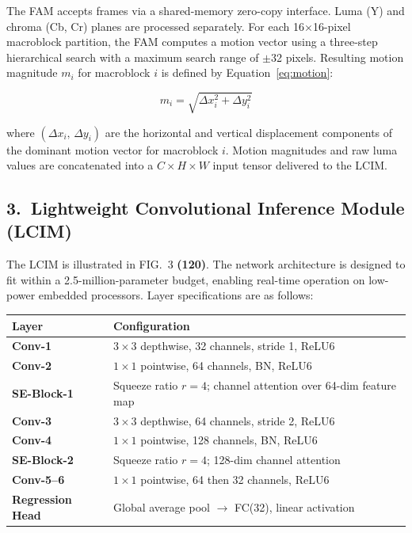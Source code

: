 \documentclass[12pt,letterpaper]{article}
\newcommand{\refnum}[1]{\textbf{(#1)}}
\begin{document}
The FAM accepts frames via a shared-memory zero-copy interface. Luma (Y) and chroma
(Cb, Cr) planes are processed separately. For each 16$\times$16-pixel macroblock
partition, the FAM computes a motion vector using a three-step hierarchical search with
a maximum search range of $\pm$32 pixels. Resulting motion magnitude $m_i$ for
macroblock $i$ is defined by Equation~\eqref{eq:motion}:

\begin{equation}\label{eq:motion}
  m_i = \sqrt{\Delta x_i^{2} + \Delta y_i^{2}}
\end{equation}

where $(\Delta x_i,\, \Delta y_i)$ are the horizontal and vertical displacement
components of the dominant motion vector for macroblock $i$. Motion magnitudes and
raw luma values are concatenated into a $C \times H \times W$ input tensor delivered
to the LCIM.

\subsection{3.~Lightweight Convolutional Inference Module (LCIM)}

The LCIM is illustrated in FIG.~3 \refnum{120}. The network architecture is designed
to fit within a 2.5-million-parameter budget, enabling real-time operation on
low-power embedded processors. Layer specifications are as follows:

\vspace{4pt}
\begin{tabularx}{\linewidth}{@{}>{\bfseries\color{accent}}l@{\hspace{6mm}}>{\raggedright\arraybackslash}X@{}}
  \toprule
  \rowcolor{lightgray}
  \textbf{\color{black}Layer} & \textbf{\color{black}Configuration} \\
  \midrule
  Conv-1 & $3\!\times\!3$ depthwise, 32 channels, stride 1, ReLU6 \\[2pt]
  Conv-2 & $1\!\times\!1$ pointwise, 64 channels, BN, ReLU6 \\[2pt]
  SE-Block-1 & Squeeze ratio $r=4$; channel attention over 64-dim feature map \\[2pt]
  Conv-3 & $3\!\times\!3$ depthwise, 64 channels, stride 2, ReLU6 \\[2pt]
  Conv-4 & $1\!\times\!1$ pointwise, 128 channels, BN, ReLU6 \\[2pt]
  SE-Block-2 & Squeeze ratio $r=4$; 128-dim channel attention \\[2pt]
  Conv-5--6 & $1\!\times\!1$ pointwise, 64 then 32 channels, ReLU6 \\[2pt]
  Regression Head & Global average pool $\to$ FC(32), linear activation \\[2pt]
  \bottomrule
\end{tabularx}
\vspace{4pt}
\end{document}
